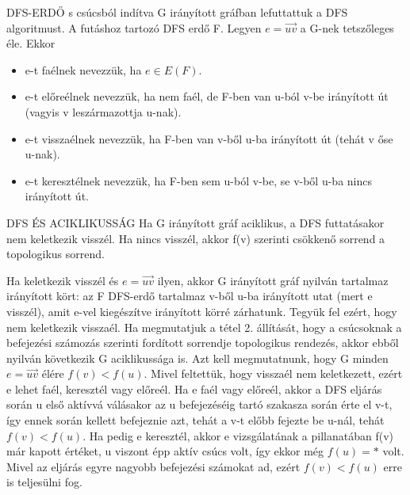 \begin{definicio}{DFS-ERDŐ}
s csúcsból indítva G irányított gráfban lefuttattuk a DFS algoritmust. A futáshoz tartozó DFS erdő F. Legyen $e=\overrightarrow{uv}$ a G-nek tetszőleges éle. Ekkor
\begin{itemize}
\item e-t faélnek nevezzük, ha $e \in E(F)$.
\item e-t előreélnek nevezzük, ha nem faél, de F-ben van u-ból v-be irányított út (vagyis v leszármazottja u-nak).
\item e-t visszaélnek nevezzük, ha F-ben van v-ből u-ba irányított út (tehát v őse u-nak).
\item e-t keresztélnek nevezzük, ha F-ben sem u-ból v-be, se v-ből u-ba nincs irányított út.
\end{itemize}
\end{definicio}

\begin{tetel}{DFS ÉS ACIKLIKUSSÁG}
Ha G irányított gráf aciklikus, a DFS futtatásakor nem keletkezik visszél. Ha nincs visszél, akkor f(v) szerinti csökkenő sorrend a topologikus sorrend.
\end{tetel}

\begin{bizonyitas}{}
Ha keletkezik visszél és $e = \overrightarrow{uv}$ ilyen, akkor G irányított gráf nyilván tartalmaz irányított kört: az F DFS-erdő tartalmaz v-ből u-ba irányított utat (mert e visszél), amit e-vel kiegészítve irányított körré zárhatunk. Tegyük fel ezért, hogy nem keletkezik visszaél. Ha megmutatjuk a tétel 2. állítását, hogy a csúcsoknak a befejezési számozás szerinti fordított sorrendje topologikus rendezés, akkor ebből nyilván következik G aciklikussága is. Azt kell megmutatnunk, hogy G minden $e = \overrightarrow{uv}$ élére $f(v) < f(u)$. Mivel feltettük, hogy visszaél nem keletkezett, ezért e lehet faél, keresztél vagy előreél. Ha e faél vagy előreél, akkor a DFS eljárás során u első aktívvá válásakor az u befejezéséig tartó szakasza során érte el v-t, így ennek során kellett befejeznie azt, tehát a v-t előbb fejezte be u-nál, tehát $f(v) < f(u)$. Ha pedig e keresztél, akkor e vizsgálatának a pillanatában f(v) már kapott értéket, u viszont épp aktív csúcs volt, így ekkor még $f(u) = *$ volt. Mivel az eljárás egyre nagyobb befejezési számokat ad, ezért $f(v) < f(u)$ erre is teljesülni fog.
\end{bizonyitas}
